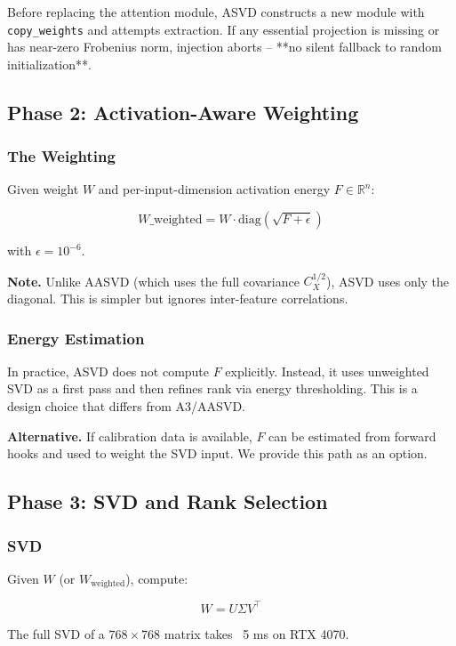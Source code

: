 Before replacing the attention module, ASVD constructs a new module with 
\texttt{copy\_weights} and attempts extraction. If any essential projection is 
missing or has near-zero Frobenius norm, injection aborts -- **no silent 
fallback to random initialization**.

\subsection{Phase 2: Activation-Aware Weighting}

\subsubsection{The Weighting}

Given weight $W$ and per-input-dimension activation energy $F \in \mathbb{R}^n$:

\[
W\_\text{weighted} = W \cdot \text{diag}(\sqrt{F + \epsilon})
\]

with $\epsilon = 10^{-6}$.

\textbf{Note.} Unlike AASVD (which uses the full covariance $C_X^{1/2}$), ASVD 
uses only the diagonal. This is simpler but ignores inter-feature 
correlations.

\subsubsection{Energy Estimation}

In practice, ASVD does not compute $F$ explicitly. Instead, it uses 
unweighted SVD as a first pass and then refines rank via energy 
thresholding. This is a design choice that differs from A3/AASVD.

\textbf{Alternative.} If calibration data is available, $F$ can be estimated 
from forward hooks and used to weight the SVD input. We provide this path 
as an option.

\subsection{Phase 3: SVD and Rank Selection}

\subsubsection{SVD}

Given $W$ (or $W_\text{weighted}$), compute:

\[
W = U \Sigma V^\top
\]

The full SVD of a $768 \times 768$ matrix takes ~5 ms on RTX 4070.

